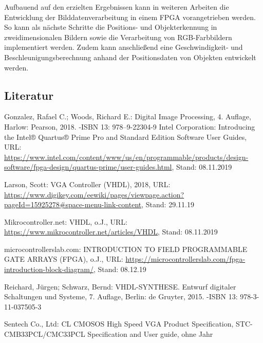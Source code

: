 \documentclass[ngerman,12pt]{article} %
\begin{document}
{Aufbauend auf den erzielten Ergebnissen kann in weiteren Arbeiten die Entwicklung der Bilddatenverarbeitung in einem  FPGA vorangetrieben werden. So kann als nächste Schritte die Positions- und Objekterkennung in zweidimensionalen Bildern sowie die Verarbeitung von RGB-Farbbildern implementiert werden. Zudem kann anschließend eine Geschwindigkeit- und Beschleunigungsberechnung anhand der Positionsdaten von Objekten entwickelt werden.
\clearpage





\begin{appendix}
\section{Literatur}
\renewcommand{\refname}{} %
\begin{thebibliography}{ABC99}
		Gonzalez, Rafael C.; Woods, Richard E.: Digital Image Processing, 4. Auflage, Harlow: Pearson, 2018. -ISBN 13: 978--9-22304-9
		Intel Corporation: Introducing the Intel® Quartus® Prime Pro and Standard Edition Software User Guides, URL: \url{https://www.intel.com/content/www/us/en/programmable/products/design-software/fpga-design/quartus-prime/user-guides.html}, Stand: 08.11.2019

		Larson, Scott: VGA Controller (VHDL), 2018, URL: \url{https://www.digikey.com/eewiki/pages/viewpage.action?pageId=15925278#space-menu-link-content}, Stand: 29.11.19

		Mikrocontroller.net: VHDL, o.J., URL: \url{https://www.mikrocontroller.net/articles/VHDL}, Stand: 08.11.2019

		microcontrollerslab.com: INTRODUCTION TO FIELD PROGRAMMABLE GATE ARRAYS (FPGA), o.J., URL: \url{https://microcontrollerslab.com/fpga-introduction-block-diagram/}, Stand: 08.12.19

		Reichard, Jürgen; Schwarz, Bernd: VHDL-SYNTHESE. Entwurf digitaler Schaltungen und Systeme, 7. Auflage, Berlin: de Gruyter, 2015. -ISBN 13: 978-3-11-037505-3

		Sentech Co., Ltd: CL CMOSOS High Speed VGA Product Specification, STC-CMB33PCL/CMC33PCL Specification and User guide, ohne Jahr


\end{thebibliography}
\end{appendix}}
\end{document}
